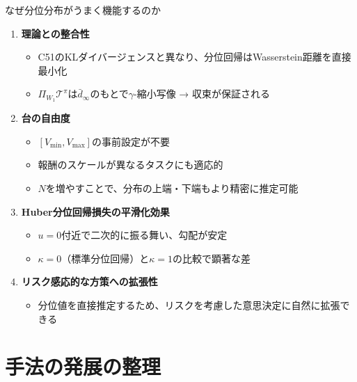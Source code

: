 \documentclass[aspectratio=169, dvipdfmx, 11pt]{beamer}
\newcommand{\green}[1]{\textcolor{green!40!black}{#1}}
\begin{document}
\begin{frame}{なぜ分位分布がうまく機能するのか}
  \begin{enumerate}
    \item \textbf{理論との整合性}
    \begin{itemize}
      \item C51のKLダイバージェンスと異なり、分位回帰は\green{Wasserstein距離}を直接最小化
      \item $\Pi_{W_1}\mathcal{T}^\pi$は$\bar{d}_\infty$のもとで$\gamma$-縮小写像 → 収束が保証される
    \end{itemize}

    \item \textbf{台の自由度}
    \begin{itemize}
      \item $[V_{\min}, V_{\max}]$の事前設定が不要
      \item 報酬のスケールが異なるタスクにも適応的
      \item $N$を増やすことで、分布の上端・下端もより精密に推定可能
    \end{itemize}

    \item \textbf{Huber分位回帰損失の平滑化効果}
    \begin{itemize}
      \item $u = 0$付近で二次的に振る舞い、勾配が安定
      \item $\kappa = 0$（標準分位回帰）と$\kappa = 1$の比較で顕著な差
    \end{itemize}

    \item \textbf{リスク感応的な方策への拡張性}
    \begin{itemize}
      \item 分位値を直接推定するため、リスクを考慮した意思決定に自然に拡張できる
    \end{itemize}
  \end{enumerate}
\end{frame}

\section{手法の発展の整理}
\end{document}
